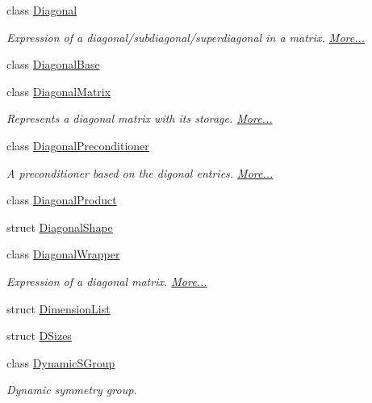 \begin{DoxyCompactItemize}
class \hyperlink{group___core___module_class_eigen_1_1_diagonal}{Diagonal}
\begin{DoxyCompactList}\small\item\em Expression of a diagonal/subdiagonal/superdiagonal in a matrix.  \hyperlink{group___core___module_class_eigen_1_1_diagonal}{More...}\end{DoxyCompactList}\item 
class \hyperlink{class_eigen_1_1_diagonal_base}{Diagonal\+Base}
\item 
class \hyperlink{group___core___module_class_eigen_1_1_diagonal_matrix}{Diagonal\+Matrix}
\begin{DoxyCompactList}\small\item\em Represents a diagonal matrix with its storage.  \hyperlink{group___core___module_class_eigen_1_1_diagonal_matrix}{More...}\end{DoxyCompactList}\item 
class \hyperlink{group___iterative_linear_solvers___module_class_eigen_1_1_diagonal_preconditioner}{Diagonal\+Preconditioner}
\begin{DoxyCompactList}\small\item\em A preconditioner based on the digonal entries.  \hyperlink{group___iterative_linear_solvers___module_class_eigen_1_1_diagonal_preconditioner}{More...}\end{DoxyCompactList}\item 
class \hyperlink{class_eigen_1_1_diagonal_product}{Diagonal\+Product}
\item 
struct \hyperlink{struct_eigen_1_1_diagonal_shape}{Diagonal\+Shape}
\item 
class \hyperlink{group___core___module_class_eigen_1_1_diagonal_wrapper}{Diagonal\+Wrapper}
\begin{DoxyCompactList}\small\item\em Expression of a diagonal matrix.  \hyperlink{group___core___module_class_eigen_1_1_diagonal_wrapper}{More...}\end{DoxyCompactList}\item 
struct \hyperlink{struct_eigen_1_1_dimension_list}{Dimension\+List}
\item 
struct \hyperlink{struct_eigen_1_1_d_sizes}{D\+Sizes}
\item 
class \hyperlink{class_eigen_1_1_dynamic_s_group}{Dynamic\+S\+Group}
\begin{DoxyCompactList}\small\item\em Dynamic symmetry group. \end{DoxyCompactList}\item 

\end{DoxyCompactItemize}
